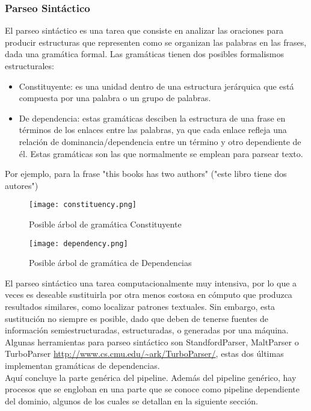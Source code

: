 \subsubsection{Parseo Sintáctico}
El parseo sintáctico es una tarea que consiste en analizar las oraciones para producir estructuras que representen como se organizan las palabras en las frases, dada una gramática formal. Las gramáticas tienen dos posibles formalismos estructurales: 
\begin{itemize}
\item Constituyente: es una unidad dentro de una estructura jerárquica que está compuesta por una palabra o un grupo de palabras. \newline
\item De dependencia: estas gramáticas desciben la estructura de una frase en términos de los enlaces entre las palabras, ya que cada enlace refleja una relación de dominancia/dependencia entre un término y otro dependiente de él. Estas gramáticas son las que normalmente se emplean para parsear texto. 
\end{itemize}
Por ejemplo, para la frase \textsf{"this books has two authors" ("este libro tiene dos autores")} \newline
\begin{figure}[H]%
\centering
\texttt{[image: constituency.png]}  %
\label{}
\caption{Posible árbol de gramática Constituyente}   
\end{figure}
\begin{figure}[H]%
\centering
\texttt{[image: dependency.png]}  %
\label{}
\caption{Posible árbol de gramática de Dependencias}   
\end{figure}

 El parseo sintáctico una tarea computacionalmente muy intensiva, por lo que a veces es deseable sustituirla por otra menos costosa en cómputo que produzca resultados similares, como \textsf{localizar patrones textuales}. Sin embargo, esta sustitución no siempre es posible, dado que deben de tenerse fuentes de información semiestructuradas, estructuradas, o generadas por una máquina. \newline
 Algunas herramientas para parseo sintáctico son \textsf{StandfordParser}, \textsf{MaltParser} \citet{nivre2006maltparser} o \textsf{TurboParser} \url{http://www.cs.cmu.edu/~ark/TurboParser/}, estas dos últimas implementan gramáticas de dependencias.
\\[\baselineskip]
Aquí concluye la parte genérica del pipeline. Además del pipeline genérico, hay procesos que se engloban en una parte que se conoce como pipeline dependiente del dominio, algunos de los cuales se detallan en la siguiente sección.


